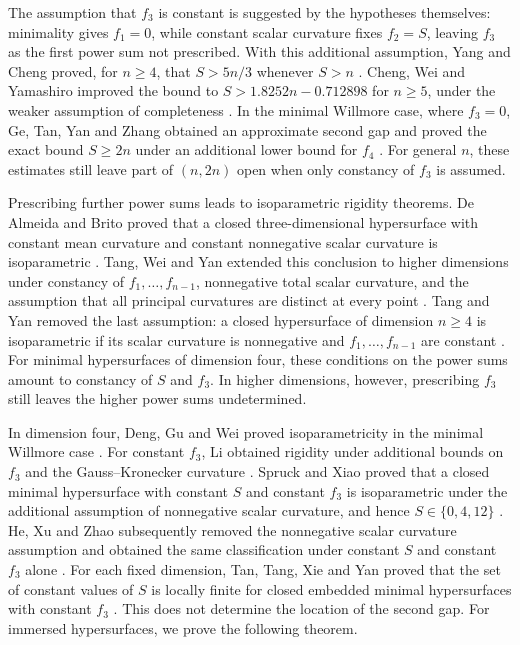 \documentclass[11pt,reqno]{amsart}
\numberwithin{equation}{section}
\begin{document}
The assumption that $f_3$ is constant is suggested by the hypotheses themselves: minimality gives $f_1=0$, while constant scalar curvature fixes $f_2=S$, leaving $f_3$ as the first power sum not prescribed. With this additional assumption, Yang and Cheng proved, for $n\ge4$, that $S>5n/3$ whenever $S>n$ \cite{YangCheng}. Cheng, Wei and Yamashiro improved the bound to $S>1.8252n-0.712898$ for $n\ge5$, under the weaker assumption of completeness \cite{CWY}. In the minimal Willmore case, where $f_3=0$, Ge, Tan, Yan and Zhang obtained an approximate second gap and proved the exact bound $S\ge2n$ under an additional lower bound for $f_4$ \cite{GeTanYanZhang}. For general $n$, these estimates still leave part of $(n,2n)$ open when only constancy of $f_3$ is assumed.

Prescribing further power sums leads to isoparametric rigidity theorems. De Almeida and Brito proved that a closed three-dimensional hypersurface with constant mean curvature and constant nonnegative scalar curvature is isoparametric \cite{deAlmeidaBrito}. Tang, Wei and Yan extended this conclusion to higher dimensions under constancy of $f_1,\ldots,f_{n-1}$, nonnegative total scalar curvature, and the assumption that all principal curvatures are distinct at every point \cite{TangWeiYan2020}. Tang and Yan removed the last assumption: a closed hypersurface of dimension $n\ge4$ is isoparametric if its scalar curvature is nonnegative and $f_1,\ldots,f_{n-1}$ are constant \cite{TangYan2023}. For minimal hypersurfaces of dimension four, these conditions on the power sums amount to constancy of $S$ and $f_3$. In higher dimensions, however, prescribing $f_3$ still leaves the higher power sums undetermined.

In dimension four, Deng, Gu and Wei proved isoparametricity in the minimal Willmore case \cite{DengGuWei}. For constant $f_3$, Li obtained rigidity under additional bounds on $f_3$ and the Gauss--Kronecker curvature \cite{Li2022}. Spruck and Xiao proved that a closed minimal hypersurface with constant $S$ and constant $f_3$ is isoparametric under the additional assumption of nonnegative scalar curvature, and hence $S\in \{0,4,12\}$ \cite{SpruckXiao2025}. He, Xu and Zhao subsequently removed the nonnegative scalar curvature assumption and obtained the same classification under constant $S$ and constant $f_3$ alone \cite{HeXuZhao}. For each fixed dimension, Tan, Tang, Xie and Yan proved that the set of constant values of $S$ is locally finite for closed embedded minimal hypersurfaces with constant $f_3$ \cite{TanTangXieYan}. This does not determine the location of the second gap. For immersed hypersurfaces, we prove the following theorem.
\end{document}
